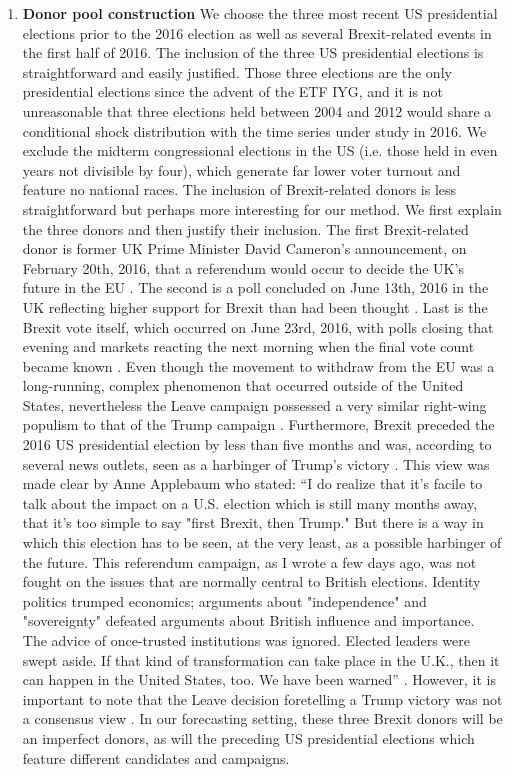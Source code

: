 \documentclass{uiucthesis2021}
\theoremstyle{definition}
\begin{document}
\begin{enumerate}
    \item \textbf{Donor pool construction} We choose the three most recent US presidential elections prior to the 2016 election as well as several Brexit-related events in the first half of 2016.  The inclusion of the three US presidential elections is straightforward and easily justified.  Those three elections are the only presidential elections since the advent of the ETF IYG, and it is not unreasonable that three elections held between 2004 and 2012 would share a conditional shock distribution with the time series under study in 2016.  We exclude the midterm congressional elections in the US (i.e. those held in even years not divisible by four), which generate far lower voter turnout and feature no national races.  The inclusion of Brexit-related donors is less straightforward but perhaps more interesting for our method.  We first explain the three donors and then justify their inclusion.  The first Brexit-related donor is former UK Prime Minister David Cameron's announcement, on February 20th, 2016, that a referendum would occur to decide the UK's future in the EU \parencite[][]{The_Guardian}.  The second is a poll concluded on June 13th, 2016 in the UK reflecting higher support for Brexit than had been thought \parencite[][]{Morales_Valentini_Penny_2016}.  Last is the Brexit vote itself, which occurred on June 23rd, 2016, with polls closing that evening and markets reacting the next morning when the final vote count became known \parencite[][]{BBC_News_2016}.  Even though the movement to withdraw from the EU was a long-running, complex phenomenon that occurred outside of the United States, nevertheless the Leave campaign possessed a very similar right-wing populism to that of the Trump campaign \parencite[][]{wilson2017brexit}. Furthermore, Brexit preceded the 2016 US presidential election by less than five months and was, according to several news outlets, seen as a harbinger of Trump's victory \parencite[][]{kay2016brexit, collins2016trump}. This view was made clear by %
    Anne Applebaum who stated: ``I do realize that it's facile to talk about the impact on a U.S. election which is still many months away, that it's too simple to say "first Brexit, then Trump." But there is a way in which this election has to be seen, at the very least, as a possible harbinger of the future. This referendum campaign, as I wrote a few days ago, was not fought on the issues that are normally central to British elections. Identity politics trumped economics; arguments about "independence" and "sovereignty" defeated arguments about British influence and importance. The advice of once-trusted institutions was ignored. Elected leaders were swept aside. If that kind of transformation can take place in the U.K., then it can happen in the United States, too. We have been warned'' \parencite[][]{applebaum2016britain}. However, it is important to note that the Leave decision foretelling a Trump victory was not a consensus view \parencite[][]{martin2016brexit, barro2016three}. In our forecasting setting, these three Brexit donors will be an imperfect donors, as will the preceding US presidential elections which feature different candidates and campaigns.

\end{enumerate}
\end{document}

